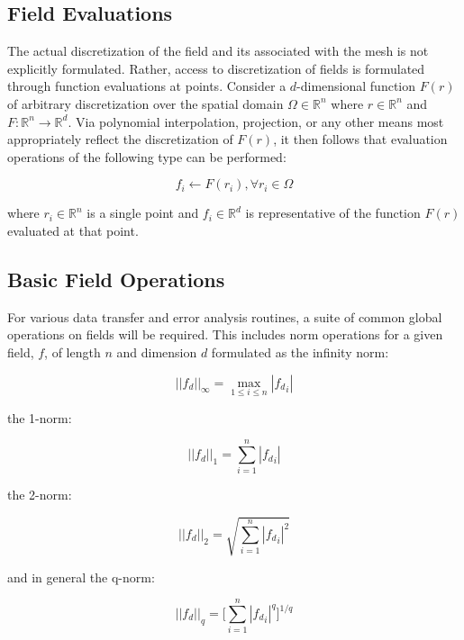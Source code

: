 \documentclass[letterpaper,12pt]{article}
\begin{document}
\subsection{Field Evaluations}\label{subsec:field_eval}
The actual discretization of the field and its associated with the
mesh is not explicitly formulated. Rather, access to discretization of
fields is formulated through function evaluations at points. Consider
a $d$-dimensional function $F(r)$ of arbitrary discretization over the
spatial domain $\Omega \in \mathbb{R}^n$ where $r \in \mathbb{R}^n$ and
  $F : \mathbb{R}^n \rightarrow \mathbb{R}^d$. Via polynomial
  interpolation, projection, or any other means most appropriately
  reflect the discretization of $F(r)$, it then follows that
  evaluation operations of the following type can be performed:

\begin{equation}
  f_i \leftarrow F(r_i), \forall r_i \in \Omega
\end{equation}

where $r_i \in \mathbb{R}^n$ is a single point and $f_i \in
\mathbb{R}^d$ is representative of the function $F(r)$ evaluated at
that point.


\subsection{Basic Field Operations}\label{subsec:field_ops}
For various data transfer and error analysis routines, a suite of
common global operations on fields will be required. This includes
norm operations for a given field, $f$, of length $n$ and dimension
$d$ formulated as the infinity norm:

\begin{equation}
  ||f_d||_\infty = \max_{1 \leq i \leq n} |{f_d}_i|
  \label{eq:infinity_norm}
\end{equation}

the 1-norm:

\begin{equation}
  ||f_d||_1 = \sum_{i=1}^n |{f_d}_i|
  \label{eq:one_norm}
\end{equation}

the 2-norm:

\begin{equation}
  ||f_d||_2 = \sqrt{ \sum_{i=1}^n |{f_d}_i|^2 }
  \label{eq:two_norm}
\end{equation}

and in general the q-norm:

\begin{equation}
||f_d||_q = \Bigg[ \sum_{i=1}^n |{f_d}_i|^q \Bigg]^{1/q}
  \label{eq:q_norm}
\end{equation}
\end{document}

